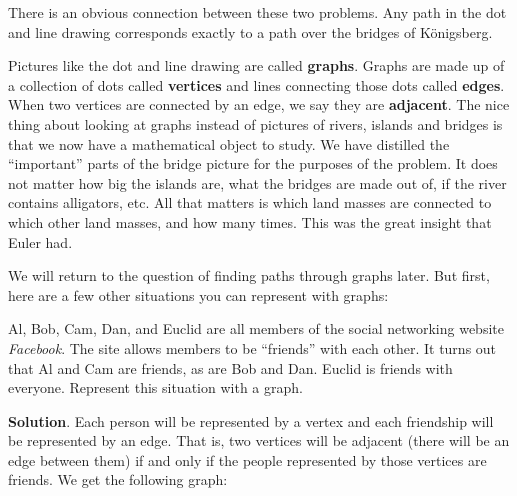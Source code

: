 \documentclass[11pt,]{book}
\newcommand{\terminology}[1]{\textbf{#1}}
\theoremstyle{ptxplainnotitle}
\theoremstyle{ptxplaintitle}
\theoremstyle{ptxdefinitionnotitle}
\theoremstyle{ptxdefinitiontitle}
\theoremstyle{ptxdefinitionnotitle}
\theoremstyle{ptxdefinitiontitle}
\theoremstyle{ptxdefinitionnotitle}
\theoremstyle{ptxdefinitiontitle}
\theoremstyle{ptxdefinitiontitlenonumber}
\theoremstyle{ptxdefinitiontitlenonumber}
\numberwithin{equation}{chapter}
\newcommand{\vtx}[2]{node[fill,circle,inner sep=0pt, minimum size=4pt,label=#1:#2]{}}
\newcommand{\vb}[1]{\vtx{below}{#1}}
\newcommand{\vr}[1]{\vtx{right}{#1}}
\newcommand{\vl}[1]{\vtx{left}{#1}}
\begin{document}
There is an obvious connection between these two problems. Any path in the dot and line drawing corresponds exactly to a path over the bridges of Königsberg.%
\par
\hypertarget{p-2693}{}%
Pictures like the dot and line drawing are called \terminology{graphs}. Graphs are made up of a collection of dots called \terminology{vertices} and lines connecting those dots called \terminology{edges}. When two vertices are connected by an edge, we say they are \terminology{adjacent}. The nice thing about looking at graphs instead of pictures of rivers, islands and bridges is that we now have a mathematical object to study. We have distilled the ``important'' parts of the bridge picture for the purposes of the problem. It does not matter how big the islands are, what the bridges are made out of, if the river contains alligators, etc. All that matters is which land masses are connected to which other land masses, and how many times. This was the great insight that Euler had.%
\par
\hypertarget{p-2694}{}%
We will return to the question of finding paths through graphs later. But first, here are a few other situations you can represent with graphs:%
\begin{example}\label{example-73}
\hypertarget{p-2695}{}%
Al, Bob, Cam, Dan, and Euclid are all members of the social networking website \emph{Facebook}. The site allows members to be ``friends'' with each other. It turns out that Al and Cam are friends, as are Bob and Dan. Euclid is friends with everyone. Represent this situation with a graph.%
\par\smallskip%
\noindent\textbf{Solution}.\hypertarget{solution-304}{}\quad%
\hypertarget{p-2696}{}%
Each person will be represented by a vertex and each friendship will be represented by an edge. That is, two vertices will be adjacent (there will be an edge between them) if and only if the people represented by those vertices are friends. We get the following graph:%
\begin{sidebyside}{1}{0.4}{0.4}{0}
\begin{sbspanel}{0.2}
\resizebox{\linewidth}{!}{{
        \begin{tikzpicture}[scale=0.7]
  \draw(-1, 0) \vl{C} -- (0,1) \vb{E} -- (-1,2) \vl{A} -- (-1,0)(1,0) \vr{D} -- (0,1)  -- (1,2) \vr{B} -- (1,0);
\end{tikzpicture}
}
}
\end{sbspanel}
\end{sidebyside}
\end{example}
\end{document}
